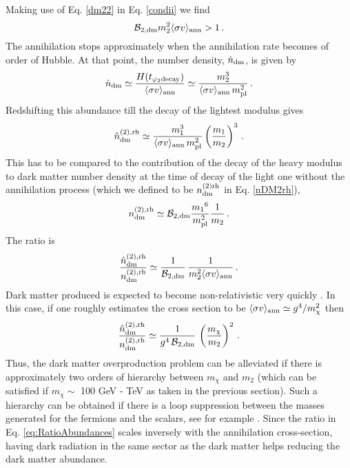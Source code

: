 \documentclass[12pt]{article}
\numberwithin{equation}{section}
\begin{document}
Making use of Eq. \eqref{dm22} in Eq. \eqref{condii} we find 
%
\begin{equation}
 \mathcal{B}_{2, \rm dm} m_{2}^2\langle \sigma v \rangle_{\rm{ann}} > 1 \,.
\end{equation}
%
The annihilation stops approximately when the annihilation rate becomes of order of Hubble. At that point, the number density, ${\hat n}_{\rm dm}$, is given
by  
%
\begin{equation}
{\hat n}_{\rm dm}  \simeq \frac{H(t_{\varphi_{\rm 2} \rm{decay}})}{\langle\sigma v \rangle_{\rm{ann}}} \simeq
\frac{ m_{2}^3}{\langle \sigma v \rangle_{\rm ann} \, m_{\rm pl}^2} \, .
\end{equation}
%
Redshifting  this abundance till the decay of the lightest modulus gives
\begin{equation}
{\hat n}_{\rm dm}^{(2), \rm rh}  \simeq \frac{ m_{1}^3}{\langle \sigma v \rangle_{\rm ann} \, m_{\rm pl}^2} \left(\frac{m_1}{m_2}\right)^3 \,.
\end{equation}
%
 This has to be compared to
the contribution of the decay of the heavy modulus to dark matter number density at the time of decay of the light one without the annihilation
process (which we defined
to be  $n_{\rm dm}^{\rm(2)  rh} $ in Eq. \eqref{nDM2rh}),
%
\begin{equation}
n_{\rm dm}^{\rm(2), rh}  \simeq \mathcal{B}_{2, \rm dm} { {m_1}^6 \over {m_{\rm pl}^2} } {1 \over m_2}\,.
\end{equation}
%
The ratio is 
\begin{equation}
\label{eq:RatioAbundances}
\frac{{\hat n}_{\rm dm}^{(2), \rm rh}}{n_{\rm dm}^{\rm(2), rh} } 
 \simeq
\frac{1}{\mathcal{B}_{2, \rm dm}} \, \frac{1}{m_2^2 \langle \sigma v \rangle_{\rm ann}}  \, .
\end{equation}
%
Dark matter produced is expected to become non-relativistic very quickly \cite{ann,Arcadi:2011ev}. In this case, if one roughly estimates
the cross section to be $\langle \sigma v \rangle_{\rm ann} \simeq g^4/m_{\chi}^2$ then
%
\begin{equation}
\label{eq:RatioAbundances2}
\frac{{\hat n}_{\rm dm}^{(2), \rm rh}}{n_{\rm dm}^{\rm(2), rh} } \simeq 
 \frac{1}{g^4 \,\mathcal{B}_{2, \rm dm}} \, \left(\frac{m_\chi}{m_{2}}\right)^2  \, .
\end{equation}
%
Thus, the dark matter overproduction problem can be alleviated if there is approximately two orders of hierarchy between
$m_\chi$ and $m_{2}$ (which can be satisfied if $m_\chi \sim$ 100 GeV - TeV as taken in the previous section). Such a hierarchy
can be obtained if there is a loop suppression between the masses generated for the fermions and the scalars, see for example
\cite{Randall:1998uk,Acharya:2008zi,bob}.
%
Since the ratio in Eq. \eqref{eq:RatioAbundances} scales inversely with the annihilation cross-section, having dark
radiation in the same sector as the dark matter helps reducing the dark matter abundance.
\end{document}
